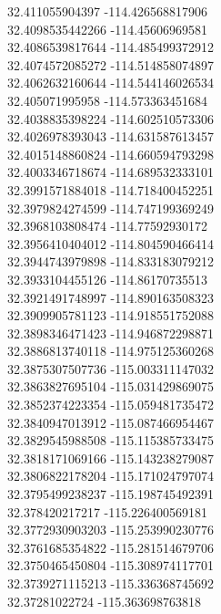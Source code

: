 {32.411055904397	-114.426568817906\\
32.4098535442266	-114.45606969581\\
32.4086539817644	-114.485499372912\\
32.4074572085272	-114.514858074897\\
32.4062632160644	-114.544146026534\\
32.405071995958	-114.573363451684\\
32.4038835398224	-114.602510573306\\
32.4026978393043	-114.631587613457\\
32.4015148860824	-114.660594793298\\
32.4003346718674	-114.689532333101\\
32.3991571884018	-114.718400452251\\
32.3979824274599	-114.747199369249\\
32.3968103808474	-114.77592930172\\
32.3956410404012	-114.804590466414\\
32.3944743979898	-114.833183079212\\
32.3933104455126	-114.86170735513\\
32.3921491748997	-114.890163508323\\
32.3909905781123	-114.918551752088\\
32.3898346471423	-114.946872298871\\
32.3886813740118	-114.975125360268\\
32.3875307507736	-115.003311147032\\
32.3863827695104	-115.031429869075\\
32.3852374223354	-115.059481735472\\
32.3840947013912	-115.087466954467\\
32.3829545988508	-115.115385733475\\
32.3818171069166	-115.143238279087\\
32.3806822178204	-115.171024797074\\
32.3795499238237	-115.198745492391\\
32.378420217217	-115.226400569181\\
32.3772930903203	-115.253990230776\\
32.3761685354822	-115.281514679706\\
32.3750465450804	-115.308974117701\\
32.3739271115213	-115.336368745692\\
32.37281022724	-115.363698763818\\
}
